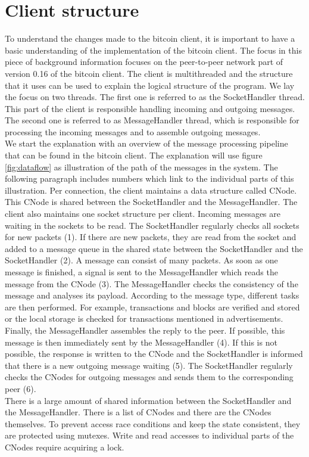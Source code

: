 \section{Client structure}
To understand the changes made to the bitcoin client, it is important to have a basic understanding of the implementation of the bitcoin client. The focus in this piece of background information focuses on the peer-to-peer network part of version 0.16 of the bitcoin client. The client is multithreaded and the structure that it uses can be used to explain the logical structure of the program. We lay the focus on two threads. The first one is referred to as the SocketHandler thread. This part of the client is responsible handling incoming and outgoing messages. The second one is referred to as MessageHandler thread, which is responsible for processing the incoming messages and to assemble outgoing messages.\\
We start the explanation with an overview of the message processing pipeline that can be found in the bitcoin client. The explanation will use figure \ref{fig:dataflow} as illustration of the path of the messages in the system. The following paragraph includes numbers which link to the individual parts of this illustration. Per connection, the client maintains a data structure called CNode. This CNode is shared between the SocketHandler and the MessageHandler. The client also maintains one socket structure per client. Incoming messages are waiting in the sockets to be read. The SocketHandler regularly checks all sockets for new packets (1). If there are new packets, they are read from the socket and added to a message queue in the shared state between the SocketHandler and the SocketHandler (2). A message can consist of many packets. As soon as one message is finished, a signal is sent to the MessageHandler which reads the message from the CNode (3). The MessageHandler checks the consistency of the message and analyses its payload. According to the message type, different tasks are then performed. For example, transactions and blocks are verified and stored or the local storage is checked for transactions mentioned in advertisements. Finally, the MessageHandler assembles the reply to the peer. If possible, this message is then immediately sent by the MessageHandler (4). If this is not possible, the response is written to the CNode and the SocketHandler is informed that there is a new outgoing message waiting (5). The SocketHandler regularly checks the CNodes for outgoing messages and sends them to the corresponding peer (6).\\
There is a large amount of shared information between the SocketHandler and the MessageHandler. There is a list of CNodes and there are the CNodes themselves. To prevent access race conditions and keep the state consistent, they are protected using mutexes. Write and read accesses to individual parts of the CNodes require acquiring a lock.

